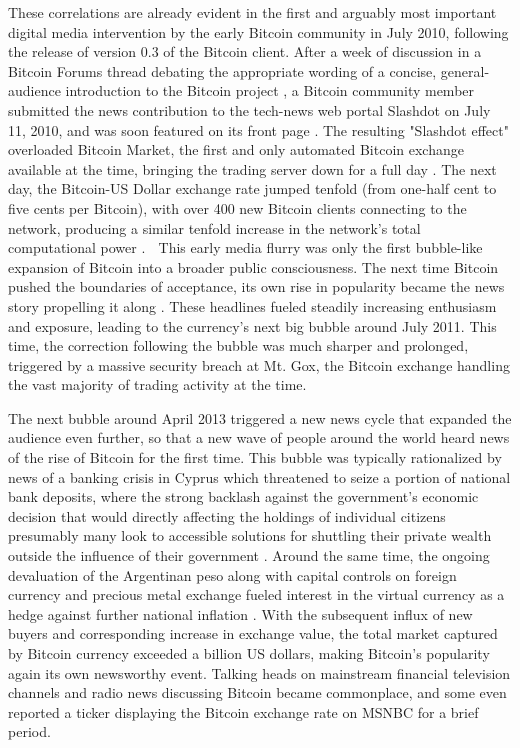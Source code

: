 These correlations are already evident in the first and arguably most important digital media intervention by the early Bitcoin community in July 2010, following the release of version 0.3 of the Bitcoin client. After a week of discussion in a Bitcoin Forums thread debating the appropriate wording of a concise, general-audience introduction to the Bitcoin project \autocite{Slashdot1.0}, a Bitcoin community member submitted the news contribution to the tech-news web portal Slashdot on July 11, 2010, and was soon featured on its front page \autocite{Slashdot2010}. The resulting "Slashdot effect" overloaded Bitcoin Market, the first and only automated Bitcoin exchange available at the time, bringing the trading server down for a full day \autocite{BitcoinMarket}. The next day, the Bitcoin-US Dollar exchange rate jumped tenfold (from one-half cent to five cents per Bitcoin), with over 400 new Bitcoin clients connecting to the network, producing a similar tenfold increase in the network's total computational power \autocite{BitcoinGrowingUp}.

This early media flurry was only the first bubble-like expansion of Bitcoin into a broader public consciousness. The next time Bitcoin pushed the boundaries of acceptance, its own rise in popularity became the news story propelling it along \autocite[e.g.,][]{Slashdot1Dollar}. These headlines fueled steadily increasing enthusiasm and exposure, leading to the currency's next big bubble around July 2011. This time, the correction following the bubble was much sharper and prolonged, triggered by a massive security breach at Mt. Gox, the Bitcoin exchange handling the vast majority of trading activity at the time.

The next bubble around April 2013 triggered a new news cycle that expanded the audience even further, so that a new wave of people around the world heard news of the rise of Bitcoin for the first time. This bubble was typically rationalized by news of a banking crisis in Cyprus which threatened to seize a portion of national bank deposits, where the strong backlash against the government's economic decision that would directly affecting the holdings of individual citizens presumably many look to accessible solutions for shuttling their private wealth outside the influence of their government \autocite{Bustillos13}. Around the same time, the ongoing devaluation of the Argentinan peso along with capital controls on foreign currency and precious metal exchange fueled interest in the virtual currency as a hedge against further national inflation \autocite{BitcoinsInArgentina}. With the subsequent influx of new buyers and corresponding increase in exchange value, the total market captured by Bitcoin currency exceeded a billion US dollars, making Bitcoin's popularity again its own newsworthy event. Talking heads on mainstream financial television channels and radio news discussing Bitcoin became commonplace, and some even reported a ticker displaying the Bitcoin exchange rate on MSNBC for a brief period.


